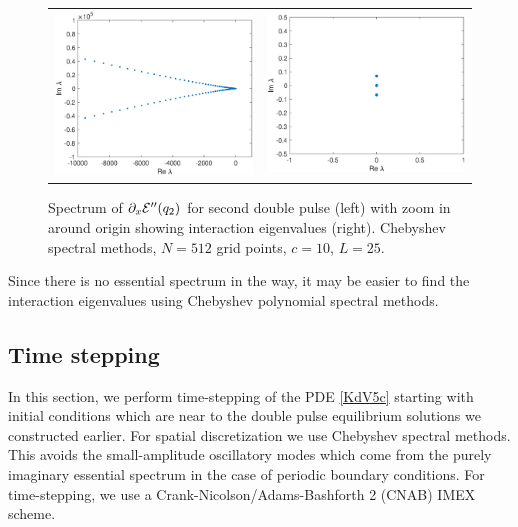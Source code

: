 \documentclass[thesis.tex]{subfiles}
\begin{document}
\begin{figure}
\begin{center}
\begin{tabular}{cc}
\includegraphics[width=6cm]{images/kdv5numerics/double2speccheb} &
\includegraphics[width=6cm]{images/kdv5numerics/double2specchebzoom.eps} \\
\end{tabular}
\caption{Spectrum of $\partial_x \mathcal{E}''(q_2)$ for second double pulse (left) with zoom in around origin showing interaction eigenvalues (right). Chebyshev spectral methods, $N = 512$ grid points, $c = 10$, $L = 25$.}
\label{fig:KdV5speccheb}
\end{center}
\end{figure}

Since there is no essential spectrum in the way, it may be easier to find the interaction eigenvalues using Chebyshev polynomial spectral methods.

\subsection{Time stepping}

In this section, we perform time-stepping of the PDE \eqref{KdV5c} starting with initial conditions which are near to the double pulse equilibrium solutions we constructed earlier. For spatial discretization we use Chebyshev spectral methods. This avoids the small-amplitude oscillatory modes which come from the purely imaginary essential spectrum in the case of periodic boundary conditions. For time-stepping, we use a Crank-Nicolson/Adams-Bashforth 2 (CNAB) IMEX scheme.
\end{document}
